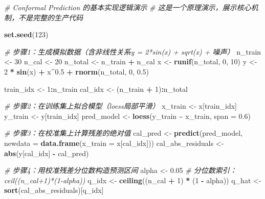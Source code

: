 \documentclass[
  twoside,12pt,fontset=none]{ctexbook}
\newenvironment{Shaded}{\begin{snugshade}}{\end{snugshade}}
\newcommand{\AttributeTok}[1]{\textcolor[rgb]{0.13,0.29,0.53}{#1}}
\newcommand{\CommentTok}[1]{\textcolor[rgb]{0.56,0.35,0.01}{\textit{#1}}}
\newcommand{\DecValTok}[1]{\textcolor[rgb]{0.00,0.00,0.81}{#1}}
\newcommand{\FloatTok}[1]{\textcolor[rgb]{0.00,0.00,0.81}{#1}}
\newcommand{\FunctionTok}[1]{\textcolor[rgb]{0.13,0.29,0.53}{\textbf{#1}}}
\newcommand{\NormalTok}[1]{#1}
\newcommand{\OtherTok}[1]{\textcolor[rgb]{0.56,0.35,0.01}{#1}}
\newcommand{\SpecialCharTok}[1]{\textcolor[rgb]{0.81,0.36,0.00}{\textbf{#1}}}
\begin{document}
\begin{Shaded}
\begin{Highlighting}[]
\CommentTok{\# Conformal Prediction 的基本实现逻辑演示}
\CommentTok{\# 这是一个原理演示，展示核心机制，不是完整的生产代码}

\FunctionTok{set.seed}\NormalTok{(}\DecValTok{123}\NormalTok{)}

\CommentTok{\# 步骤1：生成模拟数据（含非线性关系y = 2*sin(x) + sqrt(x) + 噪声）}
\NormalTok{n\_train }\OtherTok{\textless{}{-}} \DecValTok{30}
\NormalTok{n\_cal }\OtherTok{\textless{}{-}} \DecValTok{20}
\NormalTok{n\_total }\OtherTok{\textless{}{-}}\NormalTok{ n\_train }\SpecialCharTok{+}\NormalTok{ n\_cal}
\NormalTok{x }\OtherTok{\textless{}{-}} \FunctionTok{runif}\NormalTok{(n\_total, }\DecValTok{0}\NormalTok{, }\DecValTok{10}\NormalTok{)}
\NormalTok{y }\OtherTok{\textless{}{-}} \DecValTok{2} \SpecialCharTok{*} \FunctionTok{sin}\NormalTok{(x) }\SpecialCharTok{+}\NormalTok{ x}\SpecialCharTok{\^{}}\FloatTok{0.5} \SpecialCharTok{+} \FunctionTok{rnorm}\NormalTok{(n\_total, }\DecValTok{0}\NormalTok{, }\FloatTok{0.5}\NormalTok{)}

\NormalTok{train\_idx }\OtherTok{\textless{}{-}} \DecValTok{1}\SpecialCharTok{:}\NormalTok{n\_train}
\NormalTok{cal\_idx }\OtherTok{\textless{}{-}}\NormalTok{ (n\_train }\SpecialCharTok{+} \DecValTok{1}\NormalTok{)}\SpecialCharTok{:}\NormalTok{n\_total}

\CommentTok{\# 步骤2：在训练集上拟合模型（loess局部平滑）}
\NormalTok{x\_train }\OtherTok{\textless{}{-}}\NormalTok{ x[train\_idx]}
\NormalTok{y\_train }\OtherTok{\textless{}{-}}\NormalTok{ y[train\_idx]}
\NormalTok{pred\_model }\OtherTok{\textless{}{-}} \FunctionTok{loess}\NormalTok{(y\_train }\SpecialCharTok{\textasciitilde{}}\NormalTok{ x\_train, }\AttributeTok{span =} \FloatTok{0.6}\NormalTok{)}

\CommentTok{\# 步骤3：在校准集上计算残差的绝对值}
\NormalTok{cal\_pred }\OtherTok{\textless{}{-}} \FunctionTok{predict}\NormalTok{(pred\_model, }\AttributeTok{newdata =} \FunctionTok{data.frame}\NormalTok{(}\AttributeTok{x\_train =}\NormalTok{ x[cal\_idx]))}
\NormalTok{cal\_abs\_residuals }\OtherTok{\textless{}{-}} \FunctionTok{abs}\NormalTok{(y[cal\_idx] }\SpecialCharTok{{-}}\NormalTok{ cal\_pred)}

\CommentTok{\# 步骤4：用校准残差分位数构造预测区间}
\NormalTok{alpha }\OtherTok{\textless{}{-}} \FloatTok{0.05}
\CommentTok{\# 分位数索引：ceil((n\_cal+1)*(1{-}alpha))}
\NormalTok{q\_idx }\OtherTok{\textless{}{-}} \FunctionTok{ceiling}\NormalTok{((n\_cal }\SpecialCharTok{+} \DecValTok{1}\NormalTok{) }\SpecialCharTok{*}\NormalTok{ (}\DecValTok{1} \SpecialCharTok{{-}}\NormalTok{ alpha))}
\NormalTok{q\_hat }\OtherTok{\textless{}{-}} \FunctionTok{sort}\NormalTok{(cal\_abs\_residuals)[q\_idx]}


\end{Highlighting}
\end{Shaded}
\end{document}
